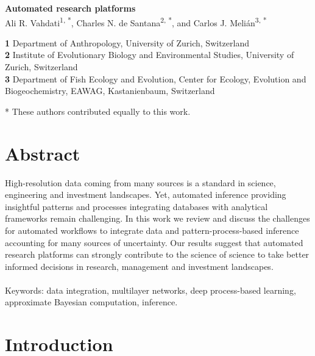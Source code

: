 \documentclass[english,12pt]{article}
\date{}
\begin{document}
\begin{flushleft}
  \textbf{\Large Automated research platforms}\\
  \vspace{0.5cm} Ali R. Vahdati\textsuperscript{1, *}, \vspace{0.5cm}
  Charles N. de Santana\textsuperscript{2, *}, and Carlos
  J. Meli\'an\textsuperscript{3, *}

\textbf{1} Department of Anthropology, University of Zurich, Switzerland\\
\textbf{2} Institute of Evolutionary Biology and Environmental Studies, University of Zurich, Switzerland\\
\textbf{3} Department of Fish Ecology and Evolution, Center for Ecology, Evolution and Biogeochemistry, EAWAG, Kastanienbaum, Switzerland
\\
\bigskip
\end{flushleft}
* These authors contributed equally to this work.\\
\newpage


\tableofcontents
\newpage

\section{Abstract}
High-resolution data coming from many sources is a standard in
science, engineering and investment landscapes. Yet, automated
inference providing insightful patterns and processes integrating
databases with analytical frameworks remain challenging. In this work
we review and discuss the challenges for automated workflows to
integrate data and pattern-process-based inference accounting for many
sources of uncertainty. Our results suggest that automated research
platforms can strongly contribute to the science of science 
to take better informed decisions in research, management and
investment landscapes.
\\
\\
Keywords: data integration, multilayer networks, deep process-based learning, approximate Bayesian
computation, inference.
\newpage


\section{Introduction}
\end{document}
